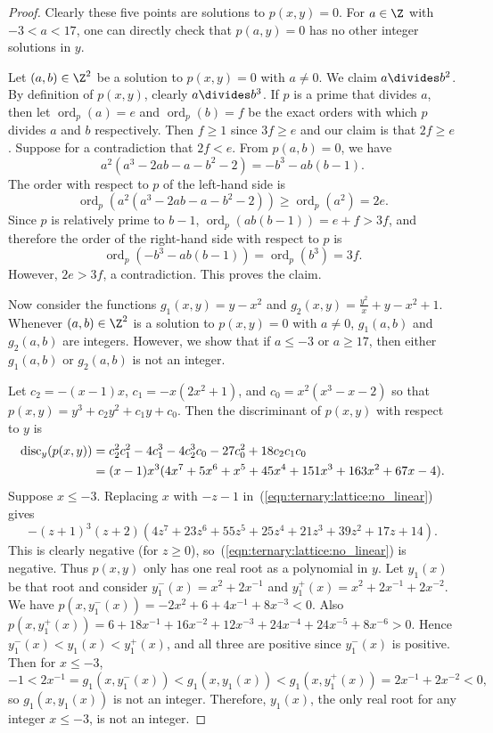 \documentclass[11pt]{article}
\begin{document}
\begin{proof}
 Clearly these five points are solutions to $p(x,y) = 0$.
 For $a \in \Z$ with $-3 < a < 17$,
 one can directly check that $p(a,y) = 0$ has no other integer solutions in $y$.

 Let $(a,b) \in \Z^2$ be a solution to $p(x,y) = 0$ with $a \ne 0$.
 We claim $a \divides b^2$.
 By definition of $p(x,y)$,
 clearly $a \divides b^3$.
 If $p$ is a prime that divides $a$,
 then let $\operatorname{ord}_p(a) = e$ and $\operatorname{ord}_p(b) = f$ be the exact orders with which $p$ divides $a$ and $b$ respectively.
 Then $f \ge 1$ since $3 f \ge e$ and our claim is that $2 f \ge e$.
 Suppose for a contradiction that $2 f < e$.
 From $p(a,b) = 0$,
 we have
 \[
  a^2 (a^3 - 2 a b - a - b^2 - 2) = -b^3 - a b (b - 1).
 \]
 The order with respect to $p$ of the left-hand side is
 \[
  \operatorname{ord}_p\left(a^2 (a^3 - 2 a b - a - b^2 - 2)\right)
  \ge \operatorname{ord}_p\left(a^2\right)
  = 2 e.
 \]
 Since $p$ is relatively prime to $b-1$,
 $\operatorname{ord}_p\left(a b (b - 1) \right) = e +f > 3f$,
 and therefore the order of the right-hand side with respect to $p$ is
 \[
  \operatorname{ord}_p\left(-b^3 - a b (b - 1)\right)
  = \operatorname{ord}_p(b^3) 
  = 3 f.
 \]
 However, $2 e > 3 f$, a contradiction.
 This proves the claim.
 
 Now consider the functions $g_1(x,y) = y - x^2$ and
 $g_2(x,y) = \frac{y^2}{x}  + y - x^2 + 1$.
 Whenever $(a,b) \in \Z^2$ is a solution to $p(x,y) = 0$ with $a \neq 0$,
 $g_1(a,b)$ and $g_2(a,b)$ are integers.
 However,
 we show that if $a \le -3$ or $a \ge 17$,
 then either $g_1(a,b)$ or $g_2(a,b)$ is not an integer.
 
 Let $c_2 = -(x-1) x$, $c_1 = -x (2 x^2 + 1)$, and $c_0 = x^2 (x^3 - x - 2)$ so that $p(x,y) = y^3 + c_2 y^2 + c_1 y + c_0$.
 Then the discriminant of $p(x,y)$ with respect to $y$ is
 \begin{align}
  \operatorname{disc}_y(p(x,y))
  &= c_2^2 c_1^2 - 4 c_1^3 - 4 c_2^3 c_0 - 27 c_0^2 + 18 c_2 c_1 c_0 \notag\\
  &= (x-1) x^3 (4 x^7 + 5 x^6 + x^5 + 45 x^4 + 151 x^3 + 163 x^2 + 67 x - 4). \label{eqn:ternary:lattice:no_linear}
 \end{align}
 Suppose $x \le -3$.
 Replacing $x$ with $-z - 1$ in~(\ref{eqn:ternary:lattice:no_linear}) gives
 \[
  -(z+1)^3 (z+2) (4 z^7 + 23 z^6 + 55 z^5 + 25 z^4 + 21 z^3 + 39 z^2 + 17 z + 14).
 \]
 This is clearly negative (for $z \ge 0$),
 so~(\ref{eqn:ternary:lattice:no_linear}) is negative.
 Thus $p(x,y)$ only has one real root as a polynomial in $y$.
 Let $y_1(x)$ be that root and consider $y_1^-(x) = x^2 + 2 x^{-1}$ and $y_1^+(x) = x^2 + 2 x^{-1} + 2 x^{-2}$.
 We have $p(x, y_1^-(x)) = -2 x^2 + 6 + 4 x^{-1} + 8 x^{-3} < 0$.
 Also $p(x, y_1^+(x)) = 6 + 18 x^{-1} + 16 x^{-2} + 12 x^{-3} + 24 x^{-4} + 24 x^{-5} + 8 x^{-6} > 0$.
 Hence $y_1^-(x) < y_1(x) < y_1^+(x)$,
 and all three are positive since $y_1^-(x)$ is positive.
 Then for $x \le -3$,
 \[
  -1
  < 2 x^{-1}
  = g_1(x, y_1^-(x))
  < g_1(x, y_1(x))
  < g_1(x, y_1^+(x))
  = 2 x^{-1} + 2 x^{-2}
  < 0,
 \]
 so $g_1(x,y_1(x))$ is not an integer.
 Therefore, $y_1(x)$, the only real root for any integer $x \le -3$, is not an integer.
 

\end{proof}
\end{document}
